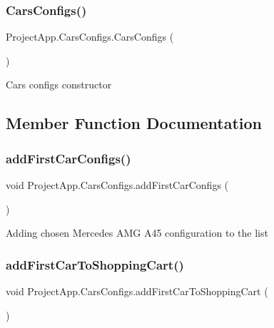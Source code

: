 \subsubsection{\texorpdfstring{Cars\+Configs()}{CarsConfigs()}}
{\footnotesize\ttfamily Project\+App.\+Cars\+Configs.\+Cars\+Configs (\begin{DoxyParamCaption}{ }\end{DoxyParamCaption})}



Cars configs constructor 



\subsection{Member Function Documentation}
\mbox{\label{class_project_app_1_1_cars_configs_a2251c7853e9b5a75da652be6e9ed64bb}} 
\subsubsection{\texorpdfstring{add\+First\+Car\+Configs()}{addFirstCarConfigs()}}
{\footnotesize\ttfamily void Project\+App.\+Cars\+Configs.\+add\+First\+Car\+Configs (\begin{DoxyParamCaption}{ }\end{DoxyParamCaption})\hspace{0.3cm}{\ttfamily [private]}}



Adding chosen Mercedes A\+MG A45 configuration to the list 

\mbox{\label{class_project_app_1_1_cars_configs_a583c7660c16bf8725967aa586b338986}} 
\subsubsection{\texorpdfstring{add\+First\+Car\+To\+Shopping\+Cart()}{addFirstCarToShoppingCart()}}
{\footnotesize\ttfamily void Project\+App.\+Cars\+Configs.\+add\+First\+Car\+To\+Shopping\+Cart (\begin{DoxyParamCaption}{ }\end{DoxyParamCaption})\hspace{0.3cm}{\ttfamily [private]}}




